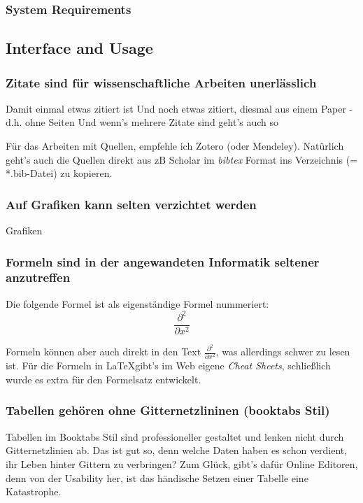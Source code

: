 \subsubsection{System Requirements}

\subsection{Interface and Usage}

\subsubsection{Zitate sind für wissenschaftliche Arbeiten unerlässlich}
Damit einmal etwas zitiert ist \cite[S. 127ff.]{knuth1997}
Und noch etwas zitiert, diesmal aus einem Paper - d.h. ohne Seiten \cite{mcintosh1995}
Und wenn's mehrere Zitate sind geht's auch so \cite{mcintosh1995,knuth1997}

Für das Arbeiten mit Quellen, empfehle ich Zotero (oder Mendeley).
Natürlich geht's auch die Quellen direkt aus zB Scholar im \textit{bibtex} Format ins Verzeichnis (= *.bib-Datei) zu kopieren.

\cite{mcintosh1995,knuth1997, granville1992}

\subsubsection{Auf Grafiken kann selten verzichtet werden}
Grafiken



\subsubsection{Formeln sind in der angewandeten Informatik seltener anzutreffen}
Die folgende Formel ist als eigenständige Formel nummeriert:
\begin{equation}
	\frac{\partial^2 }{\partial x^2}  %
\end{equation}


Formeln können aber auch direkt in den Text $\frac{\partial^2 }{\partial x^2}$, was allerdings schwer zu lesen ist.
Für die Formeln in \LaTeX gibt's im Web eigene \textit{Cheat Sheets}, schließlich wurde es extra für den Formelsatz entwickelt.


\subsubsection{Tabellen gehören ohne Gitternetzlininen (booktabs Stil)}
Tabellen im Booktabs Stil sind professioneller gestaltet und lenken nicht durch Gitternetzlinien ab. Das ist gut so, denn welche Daten haben es schon verdient, ihr Leben hinter Gittern zu verbringen?
Zum Glück, gibt's dafür Online Editoren, denn von der Usability her, ist das händische Setzen einer Tabelle eine Katastrophe.

